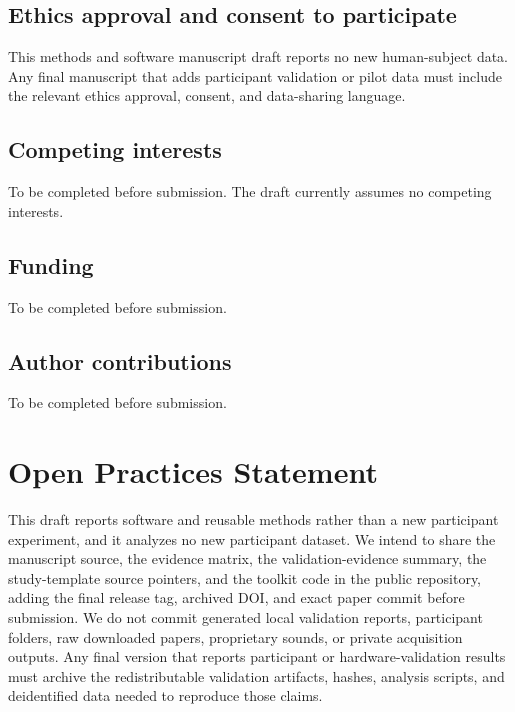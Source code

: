 \documentclass[pdflatex,sn-apa]{sn-jnl}
\begin{document}
\subsection*{Ethics approval and consent to participate}
This methods and software manuscript draft reports no new human-subject data. Any final manuscript that adds participant validation or pilot data must include the relevant ethics approval, consent, and data-sharing language.

\subsection*{Competing interests}
To be completed before submission. The draft currently assumes no competing interests.

\subsection*{Funding}
To be completed before submission.

\subsection*{Author contributions}
To be completed before submission.

\section*{Open Practices Statement}
This draft reports software and reusable methods rather than a new participant experiment, and it analyzes no new participant dataset. We intend to share the manuscript source, the evidence matrix, the validation-evidence summary, the study-template source pointers, and the toolkit code in the public repository, adding the final release tag, archived DOI, and exact paper commit before submission. We do not commit generated local validation reports, participant folders, raw downloaded papers, proprietary sounds, or private acquisition outputs. Any final version that reports participant or hardware-validation results must archive the redistributable validation artifacts, hashes, analysis scripts, and deidentified data needed to reproduce those claims.


\end{document}
